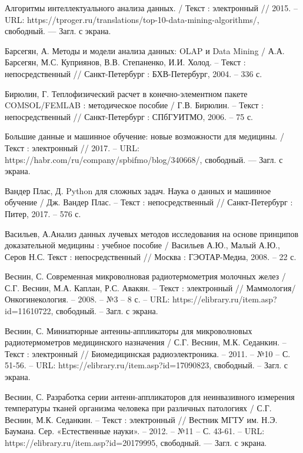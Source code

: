 \begin{thebibliography}{3}
	 Алгоритмы интеллектуального анализа данных. / Текст : электронный // 2015. -- URL: https://tproger.ru/translations/top-10-data-mining-algorithms/, свободный. — Загл. с экрана.
	
	 Барсегян, А. Методы и модели анализа данных: OLAP и Data Mining / А.А. Барсегян, М.С. Куприянов, В.В. Степаненко, И.И. Холод. -- Текст : непосредственный // Санкт-Петербург : 
	БХВ-Петербург, 2004. -- 336 с.
	
	 Бирюлин, Г. Теплофизический расчет в конечно-элементном пакете COMSOL/FEMLAB :  методическое пособие / Г.В. Бирюлин. -- Текст : непосредственный // Санкт-Петербург : СПбГУИТМО, 2006. -- 75 с.
	
	 Большие данные и машинное обучение: новые возможности для медицины. / Текст : электронный // 2017. -- URL: https://habr.com/ru/company/spbifmo/blog/340668/, свободный. — Загл. с экрана.
	
	 Вандер Плас, Д. Python для сложных задач. Наука о данных и машинное обучение / Дж. Вандер Плас. -- Текст : непосредственный // Санкт-Петербург : Питер, 2017. -- 576 с.
	
	 Васильев, А.Анализ данных лучевых методов исследования на основе принципов доказательной медицины : учебное пособие / Васильев А.Ю., Малый А.Ю., Серов Н.С. Текст : непосредственный // Москва : ГЭОТАР-Медиа, 2008. -- 22 с.
	
	 Веснин, С. Современная микроволновая радиотермометрия молочных желез / С.Г. Веснин, М.А. Каплан, Р.С. Авакян. -- Текст : электронный // Маммология/Онкогинекология. -- 2008. -- №3 -- 8 с. -- URL: https://elibrary.ru/item.asp?id=11610722, свободный. -- Загл. с экрана.
	
	 Веснин, С. Миниатюрные антенны-аппликаторы для микроволновых радиотермометров медицинского назначения / С.Г. Веснин, М.К. Седанкин. -- Текст : электронный // Биомедицинская радиоэлектроника. -- 2011. -- №10 -- С. 51-56. -- URL: https://elibrary.ru/item.asp?id=17090823, свободный. -- Загл. с экрана.
	
	 Веснин, С. Разработка серии антенн-аппликаторов для неинвазивного измерения температуры тканей организма человека при различных патологиях / С.Г. Веснин, М.К. Седанкин. -- Текст : электронный // Вестник МГТУ им. Н.Э. Баумана. Сер. «Естественные науки». -- 2012. -- №11 -- С. 43-61. -- URL: https://elibrary.ru/item.asp?id=20179995, свободный. — Загл. с экрана.
	

\end{thebibliography}
